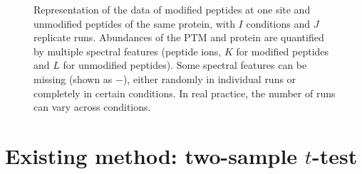 \documentclass{mcp}
\begin{document}
\begin{figure}[h!]
\begin{footnotesize}
\end{footnotesize}
\caption{Representation of the data of modified peptides at one site and unmodified peptides of the same protein, with $I$ conditions and $J$ replicate runs. Abundances of the PTM and protein are quantified by multiple spectral features (peptide ions, $K$ for modified peptides and $L$ for unmodified peptides). Some spectral features can be missing (shown as $-$), either randomly in individual runs or completely in certain conditions. In real practice, the number of runs can vary across conditions. \label{fig:dtable}}
\end{figure}


\section{Existing method: two-sample $t$-test}
\label{sec:ttest}
\end{document}
